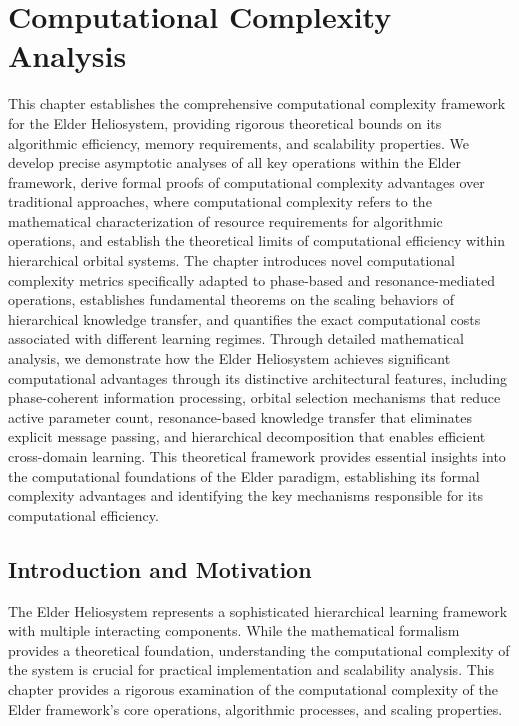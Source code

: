 \chapter{Computational Complexity Analysis}

\begin{tcolorbox}[colback=DarkSkyBlue!5!white,colframe=DarkSkyBlue!75!black,title=Chapter Summary]
This chapter establishes the comprehensive computational complexity framework for the Elder Heliosystem, providing rigorous theoretical bounds on its algorithmic efficiency, memory requirements, and scalability properties. We develop precise asymptotic analyses of all key operations within the Elder framework, derive formal proofs of computational complexity advantages over traditional approaches, where computational complexity refers to the mathematical characterization of resource requirements for algorithmic operations, and establish the theoretical limits of computational efficiency within hierarchical orbital systems. The chapter introduces novel computational complexity metrics specifically adapted to phase-based and resonance-mediated operations, establishes fundamental theorems on the scaling behaviors of hierarchical knowledge transfer, and quantifies the exact computational costs associated with different learning regimes. Through detailed mathematical analysis, we demonstrate how the Elder Heliosystem achieves significant computational advantages through its distinctive architectural features, including phase-coherent information processing, orbital selection mechanisms that reduce active parameter count, resonance-based knowledge transfer that eliminates explicit message passing, and hierarchical decomposition that enables efficient cross-domain learning. This theoretical framework provides essential insights into the computational foundations of the Elder paradigm, establishing its formal complexity advantages and identifying the key mechanisms responsible for its computational efficiency.
\end{tcolorbox}

\section{Introduction and Motivation}

The Elder Heliosystem represents a sophisticated hierarchical learning framework with multiple interacting components. While the mathematical formalism provides a theoretical foundation, understanding the computational complexity of the system is crucial for practical implementation and scalability analysis. This chapter provides a rigorous examination of the computational complexity of the Elder framework's core operations, algorithmic processes, and scaling properties.


